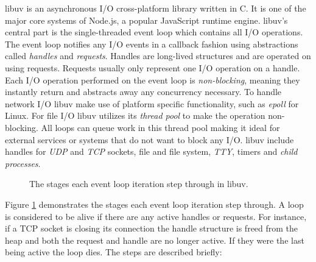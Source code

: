 libuv is an asynchronous I/O cross-platform library written in C. It is one of
the major core systems of Node.js, a popular JavaScript runtime engine. libuv's
central part is the single-threaded event loop which contains all I/O
operations. The event loop notifies any I/O events in a callback fashion using
abstractions called \textit{handles} and \textit{requests}. Handles are
long-lived structures and are operated on using requests. Requests usually only
represent one I/O operation on a handle. Each I/O operation performed on the
event loop is \textit{non-blocking}, meaning they instantly return and
abstracts away any concurrency necessary. To handle network I/O libuv make use
of platform specific functionality, such as \textit{epoll} for Linux. For file
I/O libuv utilizes its \textit{thread pool} to make the operation non-blocking.
All loops can queue work in this thread pool making it ideal for external
services or systems that do not want to block any I/O. libuv include handles
for \textit{UDP} and \textit{TCP} sockets, file and file system, \textit{TTY},
timers and \textit{child processes}. \cite{libuv-docs}

\begin{figure}[h!]
\centering
    \caption[libuv event loop]{The stages each event loop iteration step
    through in libuv.}
    \label{fig:loop_iteration}
\end{figure}

Figure \ref{fig:loop_iteration} demonstrates the stages each event loop
iteration step through. A loop is considered to be alive if there are any
active handles or requests. For instance, if a TCP socket is closing its
connection the handle structure is freed from the heap and both the request and
handle are no longer active. If they were the last being active the loop dies.
The steps are described briefly: \cite{libuv-docs}


